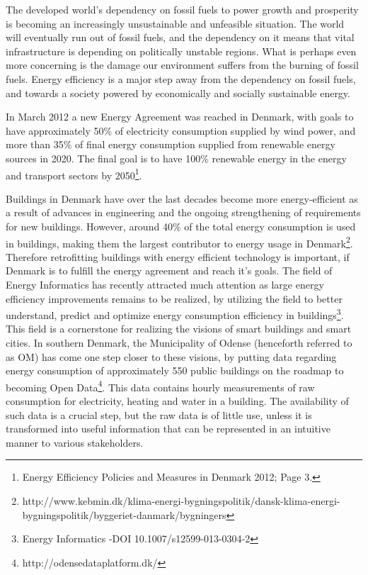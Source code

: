 The developed world’s dependency on fossil fuels to power growth and prosperity is becoming an increasingly unsustainable and unfeasible situation. The world will eventually run out of fossil fuels, and the dependency on it means that vital infrastructure is depending on politically unstable regions. What is perhaps even more concerning is the damage our environment suffers from the burning of fossil fuels. Energy efficiency is a major step away from the dependency on fossil fuels, and towards a society powered by economically and socially sustainable energy. 

In March 2012 a new Energy Agreement was reached in Denmark, with goals to have approximately 50\% of electricity consumption supplied by wind power, and more than 35\% of final energy consumption supplied from renewable energy sources in 2020. The final goal is to have 100\% renewable energy in the energy and transport sectors by 2050\footnote{Energy Efficiency Policies and Measures in Denmark 2012; Page 3.}.

Buildings in Denmark have over the last decades become more energy-efficient as a result of advances in engineering and the ongoing strengthening of requirements for new buildings. However, around 40\% of the total energy consumption  is used in buildings, making them the largest contributor to energy usage in Denmark\footnote{http://www.kebmin.dk/klima-energi-bygningspolitik/dansk-klima-energi-bygningspolitik/byggeriet-danmark/bygningers}. Therefore retrofitting buildings with energy efficient technology is important, if Denmark is to fulfill the energy agreement and reach it’s goals. The field of Energy Informatics has recently attracted much attention as large energy efficiency improvements remains to be realized, by utilizing the field to better understand, predict and optimize energy consumption efficiency in buildings\footnote{Energy Informatics -DOI 10.1007/s12599-013-0304-2}. This field is a cornerstone for realizing the visions of smart buildings and smart cities. In southern Denmark, the Municipality of Odense (henceforth referred to as OM) has come one step closer to these visions, by putting data regarding energy consumption of approximately 550 public buildings on the roadmap to becoming Open Data\footnote{http://odensedataplatform.dk/}. This data contains hourly measurements of raw consumption for electricity, heating and water in a building. The availability of such data is a crucial step, but the raw data is of little use, unless it is transformed into useful information that can be represented in an intuitive manner to various stakeholders.


